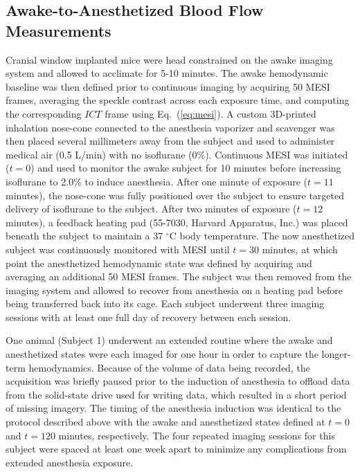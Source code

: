 \documentclass[review]{elsarticle}
\begin{document}

\subsection{Awake-to-Anesthetized Blood Flow Measurements}

Cranial window implanted mice were head constrained on the awake imaging system and allowed to acclimate for 5-10 minutes. The awake hemodynamic baseline was then defined prior to continuous imaging by acquiring 50 MESI frames, averaging the speckle contrast across each exposure time, and computing the corresponding $ICT$ frame using Eq.~(\ref{eq:mesi}). A custom 3D-printed inhalation nose-cone connected to the anesthesia vaporizer and scavenger was then placed several millimeters away from the subject and used to administer medical air (0.5 L/min) with no isoflurane (0\%). Continuous MESI was initiated ($t = 0$) and used to monitor the awake subject for 10 minutes before increasing isoflurane to 2.0\% to induce anesthesia. After one minute of exposure ($t = 11$ minutes), the nose-cone was fully positioned over the subject to ensure targeted delivery of isoflurane to the subject. After two minutes of exposure ($t = 12$ minutes), a feedback heating pad (55-7030, Harvard Apparatus, Inc.) was placed beneath the subject to maintain a 37 $^\circ$C body temperature. The now anesthetized subject was continuously monitored with MESI until $t = 30$ minutes, at which point the anesthetized hemodynamic state was defined by acquiring and averaging an additional 50 MESI frames. The subject was then removed from the imaging system and allowed to recover from anesthesia on a heating pad before being transferred back into its cage. Each subject underwent three imaging sessions with at least one full day of recovery between each session.

One animal (Subject 1) underwent an extended routine where the awake and anesthetized states were each imaged for one hour in order to capture the longer-term hemodynamics. Because of the volume of data being recorded, the acquisition was briefly paused prior to the induction of anesthesia to offload data from the solid-state drive used for writing data, which resulted in a short period of missing imagery. The timing of the anesthesia induction was identical to the protocol described above with the awake and anesthetized states defined at $t = 0$ and $t = 120$ minutes, respectively. The four repeated imaging sessions for this subject were spaced at least one week apart to minimize any complications from extended anesthesia exposure.
\end{document}
